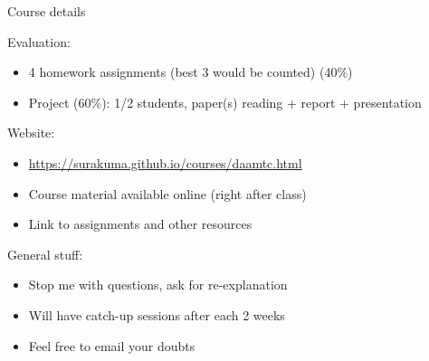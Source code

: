 \documentclass[
	12pt, %
]{beamer}
\newcommand{\brown}[1]{{\color{brown} #1 }}
\begin{document}
\begin{frame}{Course details}

\brown{Evaluation:}
\begin{itemize}
	\item 4 homework assignments (best 3 would be counted) (40\%)
	\item Project (60\%): 1/2 students, paper(s) reading + report + presentation
\end{itemize}
\vfill
\brown{Website:}
\begin{itemize}
	\item \url{https://surakuma.github.io/courses/daamtc.html}
	\item Course material available online (right after class)
	\item Link to assignments and other resources
\end{itemize}
\vfill
\brown{General stuff:}
\begin{itemize}
	\item Stop me with questions, ask for re-explanation
	\item Will have catch-up sessions after each 2 weeks
	\item Feel free to email your doubts
\end{itemize}


\end{frame}
\end{document}
